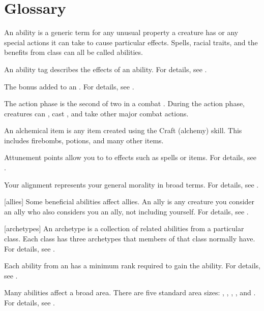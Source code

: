 \chapter{Glossary}\label{Glossary}

 An ability is a generic term for any unusual property a creature has or any special actions it can take to cause particular effects.
Spells, racial traits, and the benefits from class  can all be called abilities.

 An ability tag describes the effects of an ability.
For details, see .

 The bonus added to an .
For details, see .

 The action phase is the second of two  in a combat .
During the action phase, creatures can , cast , and take other major combat actions.

 An alchemical item is any item created using the Craft (alchemy) skill.
This includes firebombs, potions, and many other items.

 Attunement points allow you to  to effects such as spells or items.
For details, see .

 Your alignment represents your general morality in broad terms.
For details, see .

[allies] Some beneficial abilities affect allies.
An ally is any creature you consider an ally who also considers you an ally, not including yourself.
For details, see .

[archetypes] An archetype is a collection of related abilities from a particular class.
Each class has three archetypes that members of that class normally have.
For details, see .

 Each ability from an  has a minimum rank required to gain the ability.
For details, see .

 Many abilities affect a broad area.
There are five standard area sizes: \smallarea, \medarea, \largearea, \hugearea, and \gargarea.
For details, see .

